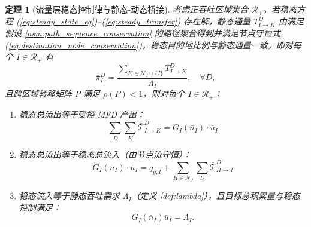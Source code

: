 \documentclass[a4paper,12pt]{article}
\theoremstyle{plain}
\newtheorem{theorem}{定理}[section]
\theoremstyle{definition}
\theoremstyle{remark}
\begin{document}
\begin{theorem}[流量层稳态控制律与静态-动态桥接]\label{thm:steady_state_bridge}
考虑正吞吐区域集合 $\mathcal R_+$。若稳态方程 (\ref{eq:steady_state_eq})--(\ref{eq:steady_transfer}) 存在解，静态通量 $T_{I\to K}^D$ 由满足假设 \ref{asm:path_sequence_conservation} 的路径聚合得到并满足节点守恒式 (\ref{eq:destination_node_conservation})，稳态目的地比例与静态通量一致，即对每个 $I\in\mathcal R_+$ 有
\begin{equation}\label{eq:steady_static_ratio}
    \bar\pi_I^D
    =
    \frac{\sum_{K\in\mathcal N_I\cup\{I\}}T_{I\to K}^D}{\Lambda_I},
    \quad \forall D,
\end{equation}
且跨区域转移矩阵 $P$ 满足 $\rho(P)<1$，则对每个 $I\in\mathcal R_+$：
\begin{enumerate}
    \item 稳态总流出等于受控 MFD 产出：
    \begin{equation}\label{eq:steady_total_outflow}
        \sum_{D} \sum_{K} \bar{\mathcal{T}}_{I \to K}^D = G_I(\bar{n}_I) \cdot \bar{u}_I
    \end{equation}
    \item 稳态总流出等于稳态总流入（由节点流守恒）：
    \begin{equation}\label{eq:steady_balance}
        G_I(\bar{n}_I) \cdot \bar{u}_I = \bar{q}_{g,I} + \sum_{H \in \mathcal{N}_I} \sum_{D} \bar{\mathcal{T}}_{H \to I}^D
    \end{equation}
    \item 稳态流入等于静态吞吐需求 $\Lambda_I$（定义 \ref{def:lambda}），且目标总积累量与稳态控制满足：
    \begin{equation}\label{eq:matching_corollary}
        G_I(\bar{n}_I)\bar{u}_I = \Lambda_I.
    \end{equation}
\end{enumerate}
\end{theorem}
\end{document}
